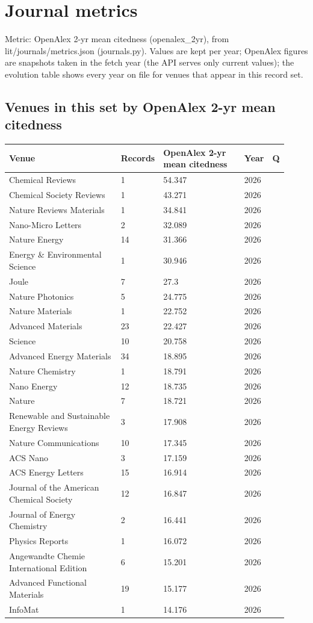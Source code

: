 \documentclass[10pt,a4paper]{article}
\begin{document}
\section*{Journal metrics}
Metric: OpenAlex 2-yr mean citedness (openalex\_2yr), from lit/journals/metrics.json (journals.py). Values are kept per year; OpenAlex figures are snapshots taken in the fetch year (the API serves only current values); the evolution table shows every year on file for venues that appear in this record set.

\subsection*{Venues in this set by OpenAlex 2-yr mean citedness}
{\scriptsize\begin{longtable}{p{0.404\linewidth}p{0.101\linewidth}p{0.294\linewidth}p{0.073\linewidth}p{0.046\linewidth}}
\hline
\textbf{Venue} & \textbf{Records} & \textbf{OpenAlex 2-yr mean citedness} & \textbf{Year} & \textbf{Q} \\ \hline
\endhead
Chemical Reviews & 1 & 54.347 & 2026 &  \\
Chemical Society Reviews & 1 & 43.271 & 2026 &  \\
Nature Reviews Materials & 1 & 34.841 & 2026 &  \\
Nano-Micro Letters & 2 & 32.089 & 2026 &  \\
Nature Energy & 14 & 31.366 & 2026 &  \\
Energy \& Environmental Science & 1 & 30.946 & 2026 &  \\
Joule & 7 & 27.3 & 2026 &  \\
Nature Photonics & 5 & 24.775 & 2026 &  \\
Nature Materials & 1 & 22.752 & 2026 &  \\
Advanced Materials & 23 & 22.427 & 2026 &  \\
Science & 10 & 20.758 & 2026 &  \\
Advanced Energy Materials & 34 & 18.895 & 2026 &  \\
Nature Chemistry & 1 & 18.791 & 2026 &  \\
Nano Energy & 12 & 18.735 & 2026 &  \\
Nature & 7 & 18.721 & 2026 &  \\
Renewable and Sustainable Energy Reviews & 3 & 17.908 & 2026 &  \\
Nature Communications & 10 & 17.345 & 2026 &  \\
ACS Nano & 3 & 17.159 & 2026 &  \\
ACS Energy Letters & 15 & 16.914 & 2026 &  \\
Journal of the American Chemical Society & 12 & 16.847 & 2026 &  \\
Journal of Energy Chemistry & 2 & 16.441 & 2026 &  \\
Physics Reports & 1 & 16.072 & 2026 &  \\
Angewandte Chemie International Edition & 6 & 15.201 & 2026 &  \\
Advanced Functional Materials & 19 & 15.177 & 2026 &  \\
InfoMat & 1 & 14.176 & 2026 &  \\
\hline
\end{longtable}}
\end{document}
